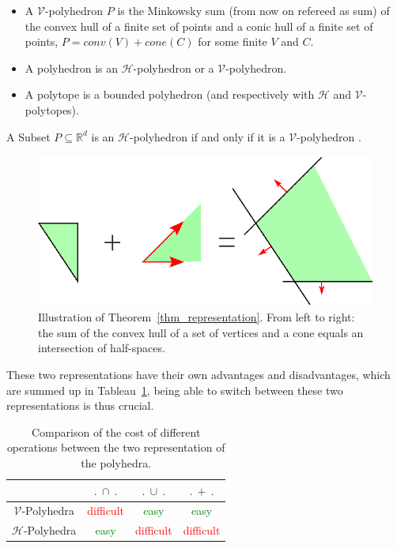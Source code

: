 \begin{definition}
\begin{itemize}
	\item A $\mathcal{V}$-polyhedron $P$ is the Minkowsky sum (from now on refereed as sum) of the convex hull of a finite set of points and a conic hull of a finite set of points, $P=conv(V)+cone(C)$ for some finite $V$ and $C$.
	\item A polyhedron is an $\mathcal{H}$-polyhedron or a $\mathcal{V}$-polyhedron.
	\item A polytope is a bounded polyhedron (and respectively with $\mathcal{H}$ and $\mathcal{V}$-polytopes).
	\end{itemize}
\end{definition}
 

\begin{theorem}
A Subset $P\subseteq\mathbb{R}^d$ is an $\mathcal{H}$-polyhedron if and only if it is a $\mathcal{V}$-polyhedron \cite{ziegler_polytopes}.
\label{thm_representation}
\end{theorem} 

\begin{figure}
\includegraphics[scale=1]{images/poly.eps}
\caption{Illustration of Theorem~\ref{thm_representation}. From left to right: the sum of the convex hull of a set of vertices and a cone equals an intersection of half-spaces.}
\end{figure}

These two representations have their own advantages and disadvantages, which are summed up  in Tableau~\ref{comparison tab}, being able to switch between these two representations is thus crucial.

\begin{table}
\begin{tabular}{| c | c | c | c |}
	\hline	
				    & $.\ \cap\ .$ & $.\ \cup\ .$ & $.\ +\ .$ \\ \hline
	$\mathcal{V}$-Polyhedra   & \textcolor{red}{difficult} & \textcolor{green}{easy} & \textcolor{green}{easy} \\ \hline
   	$\mathcal{H}$-Polyhedra   & \textcolor{green}{easy} & \textcolor{red}{difficult} & \textcolor{red}{difficult}\\ \hline
\end{tabular}
\caption{Comparison of the cost of different operations between the two representation of the polyhedra.}
\label{comparison tab}
\end{table}

